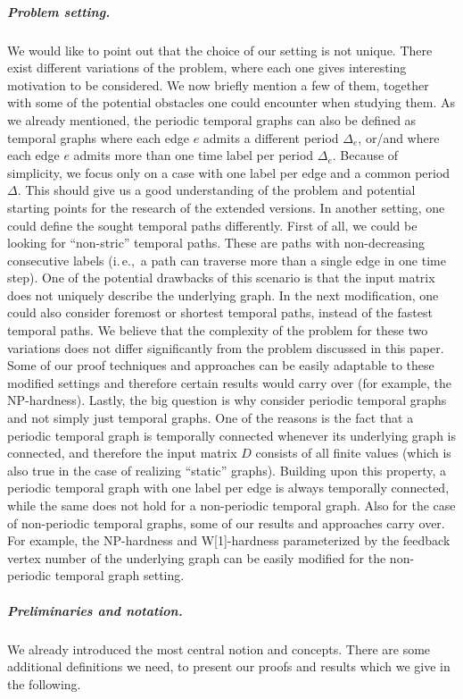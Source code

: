 \documentclass[a4paper,UKenglish,cleveref, autoref, thm-restate]{lipics-v2021}
\newcommand{\ie}{i.\,e.,\ }
\begin{document}
\subparagraph{Problem setting.}
We would like to point out that the choice of our setting is not unique. There exist different variations of the problem, where each one gives interesting motivation to be considered. We now briefly mention a few of them, together with some of the potential obstacles one could encounter when studying them.
As we already mentioned, the periodic temporal graphs can also be defined as temporal graphs where each edge $e$ admits a different period $\Delta_e$, or/and where each edge $e$ admits more than one time label per period $\Delta_e$.
Because of simplicity, we focus only on a case with one label per edge and a common period $\Delta$. This should give us a good understanding of the problem and potential starting points for the research of the extended versions.
In another setting, one could define the sought temporal paths differently.
First of all, we could be looking for ``non-stric'' temporal paths. These are paths with non-decreasing consecutive labels (\ie a path can traverse more than a single edge in one time step).
One of the potential drawbacks of this scenario is that the input matrix does not uniquely describe the underlying graph.
In the next modification, one could also consider foremost or shortest temporal paths, instead of the fastest temporal paths.
We believe that the complexity of the problem for these two variations does not differ significantly from the problem discussed in this paper.
Some of our proof techniques and approaches can be easily adaptable to these modified settings and therefore certain results would carry over (for example, the NP-hardness).
Lastly, the big question is why consider periodic temporal graphs and not simply just temporal graphs.
One of the reasons is the fact that a periodic temporal graph is temporally connected whenever its underlying graph is connected, and therefore the input matrix $D$ consists of all finite values (which is also true in the case of realizing ``static'' graphs).
Building upon this property, a periodic temporal graph with one label per edge is always temporally connected, while the same does not hold for a non-periodic temporal graph.
Also for the case of non-periodic temporal graphs, some of our results and approaches carry over. For example, the NP-hardness and W[1]-hardness parameterized by the feedback vertex number of the underlying graph can be easily modified for the non-periodic temporal graph setting.


\subparagraph{Preliminaries and notation.}
We already introduced the most central notion and concepts. There are some additional definitions we need, to present our proofs and results which we give in the following. 
\end{document}
